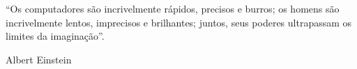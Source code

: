 

\begin{flushright}
\begin{minipage}[r]{10cm}
\vspace{18cm}
``Os computadores são incrivelmente rápidos, precisos e burros; os homens são incrivelmente lentos, imprecisos e brilhantes; juntos, seus poderes ultrapassam os limites da imaginação''.
\begin{flushright}
Albert Einstein
\end{flushright}
\end{minipage}
\end{flushright}